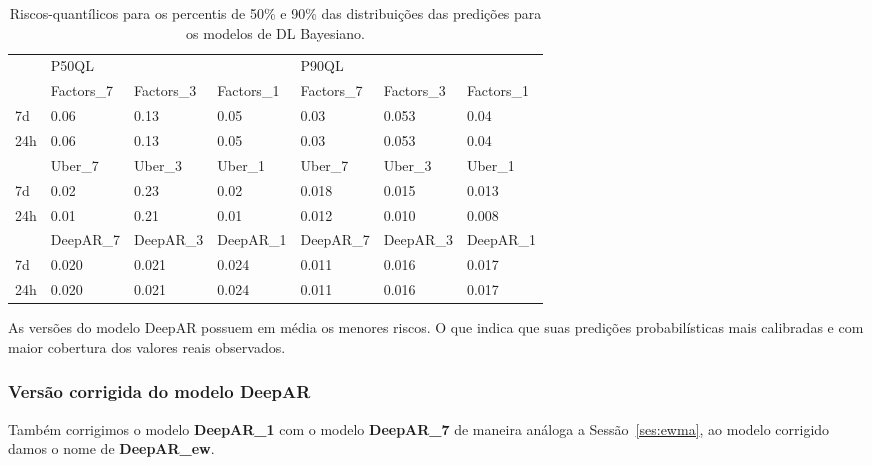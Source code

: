 \begin{center}
\begin{table}
  \begin{tabular}{l|l|l|l|l|l|l|}
    \cline{2-7}
    & \multicolumn{3}{l|}{P50QL}                       & \multicolumn{3}{l|}{P90QL}                       \\ \cline{2-7} 
    & Factors\_7 & Factors\_3 & Factors\_1 & Factors\_7 & Factors\_3 & Factors\_1 \\ \hline
    \multicolumn{1}{|l|}{7d}  & 0.06           & 0.13           & 0.05           & 0.03           & 0.053          & 0.04           \\ \hline
    \multicolumn{1}{|l|}{24h} & 0.06           & 0.13           & 0.05           & 0.03           & 0.053          & 0.04           \\ \hline
    & Uber\_7 & Uber\_3 & Uber\_1 & Uber\_7 & Uber\_3 & Uber\_1 \\ \hline
    \multicolumn{1}{|l|}{7d}  & 0.02    & 0.23    & 0.02    & 0.018    & 0.015   & 0.013    \\ \hline
    \multicolumn{1}{|l|}{24h} & 0.01    & 0.21    & 0.01    & 0.012   & 0.010   & 0.008    \\ \hline
    & DeepAR\_7 & DeepAR\_3 & DeepAR\_1 & DeepAR\_7 & DeepAR\_3 & DeepAR\_1 \\ \hline
    \multicolumn{1}{|l|}{7d}  & 0.020     & 0.021     & 0.024     & 0.011     & 0.016     & 0.017     \\ \hline
    \multicolumn{1}{|l|}{24h} &  0.020     & 0.021     & 0.024     & 0.011     & 0.016     & 0.017     \\ \hline
  \end{tabular}
  \caption{Riscos-quantílicos para os percentis de 50\% e 90\% das distribuições
    das predições para os modelos de DL Bayesiano.}
  \label{tb:quants}
\end{table}
\end{center}


As versões do modelo DeepAR possuem em média os menores riscos. O que indica que
suas predições probabilísticas mais calibradas e com maior cobertura dos valores
reais observados.


\subsubsection{Versão corrigida do modelo DeepAR}

Também corrigimos o modelo \textbf{DeepAR\_1} com o modelo \textbf{DeepAR\_7} de maneira análoga a
Sessão~\ref{ses:ewma}, ao modelo corrigido damos o nome de \textbf{DeepAR\_ew}.

